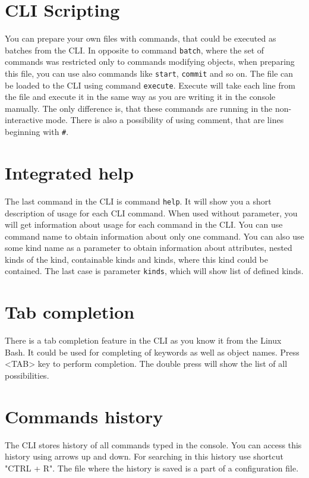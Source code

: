 \documentclass[deska]{subfiles}
\begin{document}
\section{CLI Scripting}

You can prepare your own files with commands, that could be executed as batches from the CLI. In opposite to command
{\tt batch}, where the set of commands was restricted only to commands modifying objects, when preparing this file, you
can use also commands like {\tt start}, {\tt commit} and so on. The file can be loaded to the CLI using command
{\tt execute}. Execute will take each line from the file and execute it in the same way as you are writing it in the
console manually. The only difference is, that these commands are running in the non-interactive mode. There is also a
possibility of using comment, that are lines beginning with {\tt \#}.

\section{Integrated help}

The last command in the CLI is command {\tt help}. It will show you a short description of usage for each CLI command.
When used without parameter, you will get information about usage for each command in the CLI. You can use command name
to obtain information about only one command. You can also use some kind name as a parameter to obtain information about
attributes, nested kinds of the kind, containable kinds and kinds, where this kind could be contained. The last case
is parameter {\tt kinds}, which will show list of defined kinds.

\section{Tab completion}

There is a tab completion feature in the CLI as you know it from the Linux Bash. It could be used for completing of
keywords as well as object names. Press <TAB> key to perform completion. The double press will show the list of all
possibilities.

\section{Commands history}

The CLI stores history of all commands typed in the console. You can access this history using arrows up and down. For
searching in this history use shortcut "CTRL + R". The file where the history is saved is a part of a configuration
file.
\end{document}
